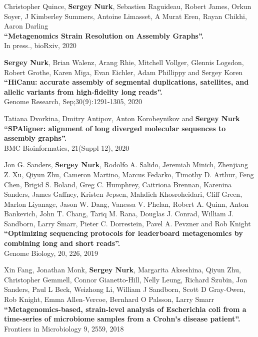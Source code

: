 \begin{outerlist}
\item
Christopher Quince, \textbf{Sergey Nurk}, Sebastien Raguideau, Robert James, Orkun Soyer, J Kimberley Summers, Antoine Limasset, A Murat Eren, Rayan Chikhi, Aaron Darling\\
\textbf{``Metagenomics Strain Resolution on Assembly Graphs''.}\\
In press., bioRxiv, 2020

\item
\textbf{Sergey Nurk}, Brian Walenz, Arang Rhie, Mitchell Vollger, Glennis Logsdon, Robert Grothe, Karen Miga, Evan Eichler, Adam Phillippy and Sergey Koren\\
\textbf{``HiCanu: accurate assembly of segmental duplications, satellites, and allelic variants from high-fidelity long reads''.}\\
Genome Research, Sep;30(9):1291-1305, 2020

\item
Tatiana Dvorkina, Dmitry Antipov, Anton Korobeynikov and \textbf{Sergey Nurk}\\
\textbf{``SPAligner: alignment of long diverged molecular sequences to assembly graphs''.}\\
BMC Bioinformatics, 21(Suppl 12), 2020

\item
Jon G. Sanders, \textbf{Sergey Nurk}, Rodolfo A. Salido, Jeremiah Minich, Zhenjiang Z. Xu, Qiyun Zhu, Cameron Martino, Marcus Fedarko, Timothy D. Arthur, Feng Chen, Brigid S. Boland, Greg C. Humphrey, Caitriona Brennan, Karenina Sanders, James Gaffney, Kristen Jepsen, Mahdieh Khosroheidari, Cliff Green, Marlon Liyanage, Jason W. Dang, Vanessa V. Phelan, Robert A. Quinn, Anton Bankevich, John T. Chang, Tariq M. Rana, Douglas J. Conrad, William J. Sandborn, Larry Smarr, Pieter C. Dorrestein, Pavel A. Pevzner and Rob Knight\\
\textbf{``Optimizing sequencing protocols for leaderboard metagenomics by combining long and short reads''.}\\
Genome Biology, 20, 226, 2019

\item
Xin Fang, Jonathan Monk, \textbf{Sergey Nurk}, Margarita Akseshina, Qiyun Zhu, Christopher Gemmell, Connor Gianetto-Hill, Nelly Leung, Richard Szubin, Jon Sanders, Paul L Beck, Weizhong Li, William J Sandborn, Scott D Gray-Owen, Rob Knight, Emma Allen-Vercoe, Bernhard O Palsson, Larry Smarr\\
\textbf{``Metagenomics-based, strain-level analysis of Escherichia coli from a time-series of microbiome samples from a Crohn’s disease patient''.}\\
Frontiers in Microbiology 9, 2559, 2018


\end{outerlist}
